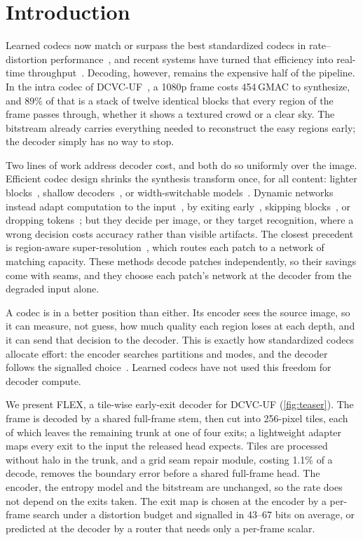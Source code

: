 \section{Introduction}
\label{sec:intro}

Learned codecs now match or surpass the best standardized codecs in rate--distortion performance~\cite{balle2018,minnen2018,cheng2020,he2022elic,liu2023tcm,li2023dcvcdc,li2024dcvcfm}, and recent systems have turned that efficiency into real-time throughput~\cite{jia2025dcvcrt,li2026dcvcuf}.
Decoding, however, remains the expensive half of the pipeline.
In the intra codec of DCVC-UF~\cite{li2026dcvcuf}, a 1080p frame costs 454\,GMAC to synthesize, and 89\% of that is a stack of twelve identical blocks that every region of the frame passes through, whether it shows a textured crowd or a clear sky.
The bitstream already carries everything needed to reconstruct the easy regions early; the decoder simply has no way to stop.

Two lines of work address decoder cost, and both do so uniformly over the image.
Efficient codec design shrinks the synthesis transform once, for all content: lighter blocks~\cite{wang2023evc}, shallow decoders~\cite{yang2023shallow}, or width-switchable models~\cite{yang2021slimcae}.
Dynamic networks instead adapt computation to the input~\cite{han2022survey}, by exiting early~\cite{teerapittayanon2016,huang2018msdnet}, skipping blocks~\cite{wang2018skipnet,wu2018blockdrop,veit2018}, or dropping tokens~\cite{rao2021dynamicvit,yin2022avit}; but they decide per image, or they target recognition, where a wrong decision costs accuracy rather than visible artifacts.
The closest precedent is region-aware super-resolution~\cite{kong2021classsr,wang2022ape,jeong2024pcsr}, which routes each patch to a network of matching capacity.
These methods decode patches independently, so their savings come with seams, and they choose each patch's network at the decoder from the degraded input alone.

A codec is in a better position than either.
Its encoder sees the source image, so it can measure, not guess, how much quality each region loses at each depth, and it can send that decision to the decoder.
This is exactly how standardized codecs allocate effort: the encoder searches partitions and modes, and the decoder follows the signalled choice~\cite{sullivan2012hevc,bross2021vvc}.
Learned codecs have not used this freedom for decoder compute.

We present FLEX, a tile-wise early-exit decoder for DCVC-UF (\cref{fig:teaser}).
The frame is decoded by a shared full-frame stem, then cut into 256-pixel tiles, each of which leaves the remaining trunk at one of four exits; a lightweight adapter maps every exit to the input the released head expects.
Tiles are processed without halo in the trunk, and a grid seam repair module, costing 1.1\% of a decode, removes the boundary error before a shared full-frame head.
The encoder, the entropy model and the bitstream are unchanged, so the rate does not depend on the exits taken.
The exit map is chosen at the encoder by a per-frame search under a distortion budget and signalled in 43--67 bits on average, or predicted at the decoder by a router that needs only a per-frame scalar.

